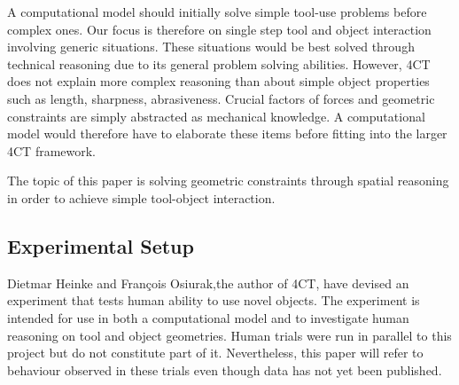 \documentclass[11]{article}
\begin{document}
A computational model should initially solve simple tool-use problems before complex ones.
Our focus is therefore on single step tool and object interaction involving generic situations.
These situations would be best solved through technical reasoning due to its general problem solving abilities. 
However, 4CT does not explain more complex reasoning than about simple object properties such as length, sharpness, abrasiveness.
Crucial factors of forces and geometric constraints are simply abstracted as mechanical knowledge. 
A computational model would therefore have to elaborate these items before fitting into the larger 4CT framework. 

The topic of this paper is solving geometric constraints through spatial reasoning in order to achieve simple tool-object interaction.  

\subsection{Experimental Setup}

Dietmar Heinke and Fran\c{c}ois Osiurak,the author of 4CT, have devised an experiment that tests human ability to use novel objects. 
The experiment is intended for use in both a computational model and to investigate human reasoning on tool and object geometries. 
Human trials were run in parallel to this project but do not constitute part of it. 
Nevertheless, this paper will refer to behaviour observed in these trials even though data has not yet been published. 
\end{document}
